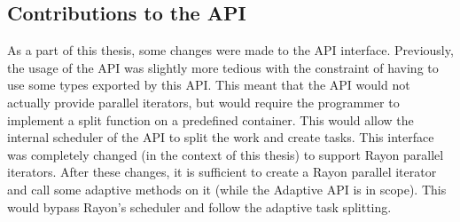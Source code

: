 
\subsection{Contributions to the API}
As a part of this thesis, some changes were made to the API interface. Previously, the usage of the API was slightly more tedious with the constraint of having to use some types exported by this API. This meant that the API would not actually provide parallel iterators, but would require the programmer to implement a split function on a predefined container. This would allow the internal scheduler of the API to split the work and create tasks. This interface was completely changed (in the context of this thesis) to support Rayon parallel iterators. After these changes, it is sufficient to create a Rayon parallel iterator and call some adaptive methods on it (while the Adaptive API is in scope). This would bypass Rayon's scheduler and follow the adaptive task splitting.
